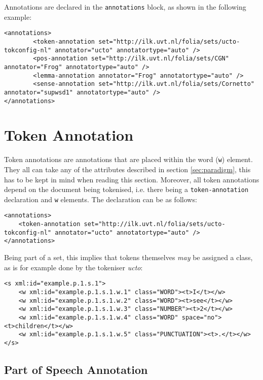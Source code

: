 \documentclass[a4paper,12pt]{article}
\begin{document}
Annotations are declared in the \texttt{annotations} block, as shown in the following example:

\begin{verbatim}
<annotations>
        <token-annotation set="http://ilk.uvt.nl/folia/sets/ucto-tokconfig-nl" annotator="ucto" annotatortype="auto" />
        <pos-annotation set="http://ilk.uvt.nl/folia/sets/CGN" annotator="Frog" annotatortype="auto" />
        <lemma-annotation annotator="Frog" annotatortype="auto" />    
        <sense-annotation set="http://ilk.uvt.nl/folia/sets/Cornetto" annotator="supwsd1" annotatortype="auto" />    
</annotations>
\end{verbatim}


\section{Token Annotation}

Token annotations are annotations that are placed within the word (\texttt{w}) element. They all can take any of the attributes described in section \ref{sec:paradigm}, this has to be kept in mind when reading this section. Moreover, all token annotations depend on the document being tokenised, i.e. there being a \texttt{token-annotation} declaration and \texttt{w} elements. The declaration can be as follows:

\begin{verbatim}
<annotations>
    <token-annotation set="http://ilk.uvt.nl/folia/sets/ucto-tokconfig-nl" annotator="ucto" annotatortype="auto" />
</annotations>
\end{verbatim}

Being part of a set, this implies that tokens themselves \emph{may} be assigned a class, as is for example done by the tokeniser \emph{ucto}:

\begin{verbatim}
<s xml:id="example.p.1.s.1">
    <w xml:id="example.p.1.s.1.w.1" class="WORD"><t>I</t></w>
    <w xml:id="example.p.1.s.1.w.2" class="WORD"><t>see</t></w>
    <w xml:id="example.p.1.s.1.w.3" class="NUMBER"><t>2</t></w>
    <w xml:id="example.p.1.s.1.w.4" class="WORD" space="no"><t>children</t></w>
    <w xml:id="example.p.1.s.1.w.5" class="PUNCTUATION"><t>.</t></w>
</s>
\end{verbatim}        


\subsection{Part of Speech Annotation}
\end{document}

